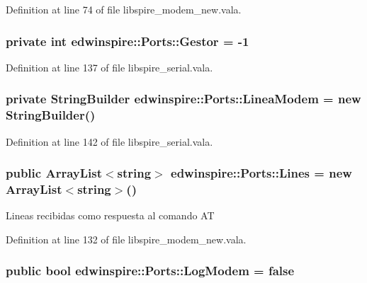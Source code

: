 Definition at line 74 of file libspire\-\_\-modem\-\_\-new.\-vala.

\hypertarget{namespaceedwinspire_1_1Ports_a7f31b8084b1c093dde91fd7d442f0c33}{
\subsubsection[{Gestor}]{\setlength{\rightskip}{0pt plus 5cm}private int edwinspire\-::\-Ports\-::\-Gestor = -\/1}}\label{namespaceedwinspire_1_1Ports_a7f31b8084b1c093dde91fd7d442f0c33}


Definition at line 137 of file libspire\-\_\-serial.\-vala.

\hypertarget{namespaceedwinspire_1_1Ports_a572884312471246cd0581385d6ce5abd}{
\subsubsection[{Linea\-Modem}]{\setlength{\rightskip}{0pt plus 5cm}private String\-Builder edwinspire\-::\-Ports\-::\-Linea\-Modem = new String\-Builder()}}\label{namespaceedwinspire_1_1Ports_a572884312471246cd0581385d6ce5abd}


Definition at line 142 of file libspire\-\_\-serial.\-vala.

\hypertarget{namespaceedwinspire_1_1Ports_a52dc2afb8cadb65ffcdf4d5c1e37a3cf}{
\subsubsection[{Lines}]{\setlength{\rightskip}{0pt plus 5cm}public Array\-List$<$string$>$ edwinspire\-::\-Ports\-::\-Lines = new Array\-List$<$string$>$()}}\label{namespaceedwinspire_1_1Ports_a52dc2afb8cadb65ffcdf4d5c1e37a3cf}


Lineas recibidas como respuesta al comando A\-T 



Definition at line 132 of file libspire\-\_\-modem\-\_\-new.\-vala.

\hypertarget{namespaceedwinspire_1_1Ports_a2d90f7f91e2a32b3ba4885640203178a}{
\subsubsection[{Log\-Modem}]{\setlength{\rightskip}{0pt plus 5cm}public bool edwinspire\-::\-Ports\-::\-Log\-Modem = false}}\label{namespaceedwinspire_1_1Ports_a2d90f7f91e2a32b3ba4885640203178a}


